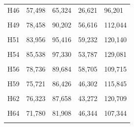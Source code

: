 \documentclass[
  a4paper,
  titlepage]{article}
\begin{document}
\begin{longtable}[t]{lllll}
H46 & 57,498 & 65,324 & 26,621 & 96,201\\
 
\cellcolor{gray!6}{H47} & \cellcolor{gray!6}{76,212} & \cellcolor{gray!6}{87,151} & \cellcolor{gray!6}{39,590} & \cellcolor{gray!6}{123,773}\\
 
H49 & 78,458 & 90,202 & 56,616 & 112,044\\
 
\cellcolor{gray!6}{H50} & \cellcolor{gray!6}{92,750} & \cellcolor{gray!6}{105,570} & \cellcolor{gray!6}{64,085} & \cellcolor{gray!6}{134,235}\\
 
H51 & 83,956 & 95,416 & 59,232 & 120,140\\
 
\cellcolor{gray!6}{H52} & \cellcolor{gray!6}{95,025} & \cellcolor{gray!6}{108,879} & \cellcolor{gray!6}{68,547} & \cellcolor{gray!6}{135,357}\\
 
H54 & 85,538 & 97,330 & 53,787 & 129,081\\
 
\cellcolor{gray!6}{H55} & \cellcolor{gray!6}{92,758} & \cellcolor{gray!6}{106,330} & \cellcolor{gray!6}{67,327} & \cellcolor{gray!6}{131,761}\\
 
H56 & 78,736 & 89,684 & 58,705 & 109,715\\
 
\cellcolor{gray!6}{H58} & \cellcolor{gray!6}{73,445} & \cellcolor{gray!6}{83,596} & \cellcolor{gray!6}{44,250} & \cellcolor{gray!6}{112,791}\\
 
H59 & 75,721 & 86,426 & 46,302 & 115,845\\
 
\cellcolor{gray!6}{H61} & \cellcolor{gray!6}{72,587} & \cellcolor{gray!6}{83,001} & \cellcolor{gray!6}{44,026} & \cellcolor{gray!6}{111,562}\\
 
H62 & 76,323 & 87,658 & 43,272 & 120,709\\
 
\cellcolor{gray!6}{H63} & \cellcolor{gray!6}{95,166} & \cellcolor{gray!6}{108,676} & \cellcolor{gray!6}{65,167} & \cellcolor{gray!6}{138,675}\\
 
H64 & 71,780 & 81,908 & 46,344 & 107,344\\
 
\cellcolor{gray!6}{H70} & \cellcolor{gray!6}{96,736} & \cellcolor{gray!6}{110,458} & \cellcolor{gray!6}{65,722} & \cellcolor{gray!6}{141,472}\\
 

\end{longtable}
\end{document}
